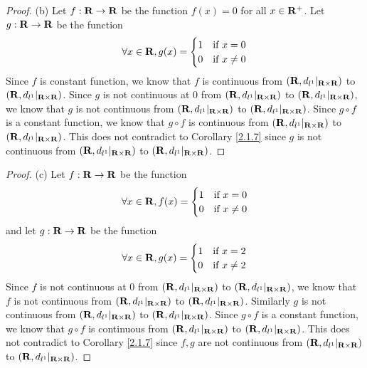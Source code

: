 \begin{proof}{(b)}
    Let \(f : \mathbf{R} \to \mathbf{R}\) be the function \(f(x) = 0\) for all \(x \in \mathbf{R}^+\).
    Let \(g : \mathbf{R} \to \mathbf{R}\) be the function
    \[
        \forall x \in \mathbf{R}, g(x) = \begin{cases}
            1 & \text{if } x = 0    \\
            0 & \text{if } x \neq 0
        \end{cases}
    \]
    Since \(f\) is constant function, we know that \(f\) is continuous from \((\mathbf{R}, d_{l^1}|_{\mathbf{R} \times \mathbf{R}})\) to \((\mathbf{R}, d_{l^1}|_{\mathbf{R} \times \mathbf{R}})\).
    Since \(g\) is not continuous at \(0\) from \((\mathbf{R}, d_{l^1}|_{\mathbf{R} \times \mathbf{R}})\) to \((\mathbf{R}, d_{l^1}|_{\mathbf{R} \times \mathbf{R}})\), we know that \(g\) is not continuous from \((\mathbf{R}, d_{l^1}|_{\mathbf{R} \times \mathbf{R}})\) to \((\mathbf{R}, d_{l^1}|_{\mathbf{R} \times \mathbf{R}})\).
    Since \(g \circ f\) is a constant function, we know that \(g \circ f\) is continuous from \((\mathbf{R}, d_{l^1}|_{\mathbf{R} \times \mathbf{R}})\) to \((\mathbf{R}, d_{l^1}|_{\mathbf{R} \times \mathbf{R}})\).
    This does not contradict to Corollary \ref{2.1.7} since \(g\) is not continuous from \((\mathbf{R}, d_{l^1}|_{\mathbf{R} \times \mathbf{R}})\) to \((\mathbf{R}, d_{l^1}|_{\mathbf{R} \times \mathbf{R}})\).
\end{proof}

\begin{proof}{(c)}
    Let \(f : \mathbf{R} \to \mathbf{R}\) be the function
    \[
        \forall x \in \mathbf{R}, f(x) = \begin{cases}
            1 & \text{if } x = 0    \\
            0 & \text{if } x \neq 0
        \end{cases}
    \]
    and let \(g : \mathbf{R} \to \mathbf{R}\) be the function
    \[
        \forall x \in \mathbf{R}, g(x) = \begin{cases}
            1 & \text{if } x = 2    \\
            0 & \text{if } x \neq 2
        \end{cases}
    \]
    Since \(f\) is not continuous at \(0\) from \((\mathbf{R}, d_{l^1}|_{\mathbf{R} \times \mathbf{R}})\) to \((\mathbf{R}, d_{l^1}|_{\mathbf{R} \times \mathbf{R}})\), we know that \(f\) is not continuous from \((\mathbf{R}, d_{l^1}|_{\mathbf{R} \times \mathbf{R}})\) to \((\mathbf{R}, d_{l^1}|_{\mathbf{R} \times \mathbf{R}})\).
    Similarly \(g\) is not continuous from \((\mathbf{R}, d_{l^1}|_{\mathbf{R} \times \mathbf{R}})\) to \((\mathbf{R}, d_{l^1}|_{\mathbf{R} \times \mathbf{R}})\).
    Since \(g \circ f\) is a constant function, we know that \(g \circ f\) is continuous from \((\mathbf{R}, d_{l^1}|_{\mathbf{R} \times \mathbf{R}})\) to \((\mathbf{R}, d_{l^1}|_{\mathbf{R} \times \mathbf{R}})\).
    This does not contradict to Corollary \ref{2.1.7} since \(f, g\) are not continuous from \((\mathbf{R}, d_{l^1}|_{\mathbf{R} \times \mathbf{R}})\) to \((\mathbf{R}, d_{l^1}|_{\mathbf{R} \times \mathbf{R}})\).
\end{proof}

